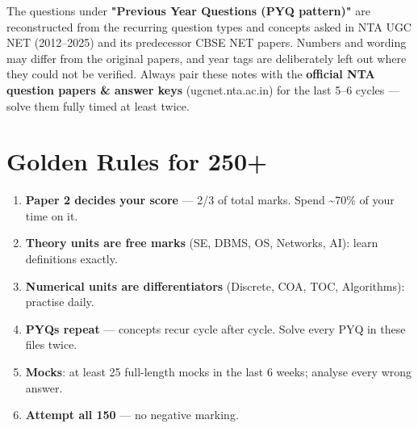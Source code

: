 The questions under \textbf{"Previous Year Questions (PYQ pattern)"} are reconstructed from the recurring
question types and concepts asked in NTA UGC NET (2012--2025) and its predecessor CBSE NET papers. Numbers and
wording may differ from the original papers, and year tags are deliberately left out where they could not be verified.
Always pair these notes with the \textbf{official NTA question papers \& answer keys} (ugcnet.nta.ac.in) for the
last 5--6 cycles --- solve them fully timed at least twice.

\needspace{95pt}

\hypertarget{intro--6-golden-rules-for-250}{%
\section{Golden Rules for 250+}\label{intro--6-golden-rules-for-250}}

\begin{enumerate}
\def\labelenumi{\arabic{enumi}.}
\tightlist
\item
  \textbf{Paper 2 decides your score} --- 2/3 of total marks. Spend \textasciitilde70\% of your time on it.
\item
  \textbf{Theory units are free marks} (SE, DBMS, OS, Networks, AI): learn definitions exactly.
\item
  \textbf{Numerical units are differentiators} (Discrete, COA, TOC, Algorithms): practise daily.
\item
  \textbf{PYQs repeat} --- concepts recur cycle after cycle. Solve every PYQ in these files twice.
\item
  \textbf{Mocks}: at least 25 full-length mocks in the last 6 weeks; analyse every wrong answer.
\item
  \textbf{Attempt all 150} --- no negative marking.
\end{enumerate}

